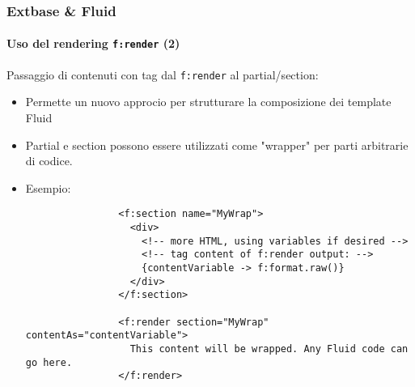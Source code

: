 \begin{frame}[fragile]
	\frametitle{Extbase \& Fluid}
	\framesubtitle{Uso del rendering \texttt{f:render} (2)}

	\lstset{basicstyle=\tiny\ttfamily}

	Passaggio di contenuti con tag dal \texttt{f:render} al partial/section:

	\begin{itemize}

		\item Permette un nuovo approcio per strutturare la composizione dei template Fluid

		\item Partial e section possono essere utilizzati come "wrapper" per parti arbitrarie di
			codice.

		\item Esempio:

			\begin{lstlisting}
				<f:section name="MyWrap">
				  <div>
				    <!-- more HTML, using variables if desired -->
				    <!-- tag content of f:render output: -->
				    {contentVariable -> f:format.raw()}
				  </div>
				</f:section>

				<f:render section="MyWrap" contentAs="contentVariable">
				  This content will be wrapped. Any Fluid code can go here.
				</f:render>
			\end{lstlisting}

	\end{itemize}

\end{frame}


